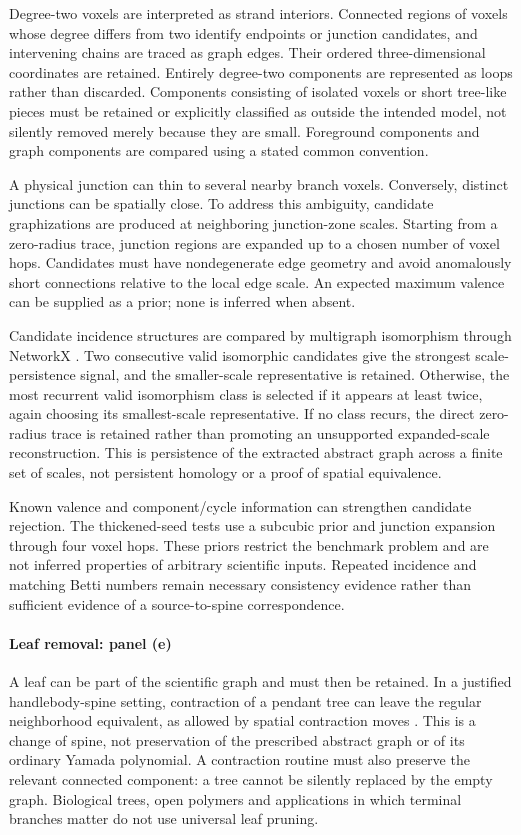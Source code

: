 Degree-two voxels are interpreted as strand interiors. Connected regions of voxels whose degree differs from two identify endpoints or junction candidates, and intervening chains are traced as graph edges. Their ordered three-dimensional coordinates are retained. Entirely degree-two components are represented as loops rather than discarded. Components consisting of isolated voxels or short tree-like pieces must be retained or explicitly classified as outside the intended model, not silently removed merely because they are small. Foreground components and graph components are compared using a stated common convention.

A physical junction can thin to several nearby branch voxels. Conversely, distinct junctions can be spatially close. To address this ambiguity, candidate graphizations are produced at neighboring junction-zone scales. Starting from a zero-radius trace, junction regions are expanded up to a chosen number of voxel hops. Candidates must have nondegenerate edge geometry and avoid anomalously short connections relative to the local edge scale. An expected maximum valence can be supplied as a prior; none is inferred when absent.

Candidate incidence structures are compared by multigraph isomorphism through NetworkX \cite{kg_hagberg2008networkx,kg_cordella2004vf2}. Two consecutive valid isomorphic candidates give the strongest scale-persistence signal, and the smaller-scale representative is retained. Otherwise, the most recurrent valid isomorphism class is selected if it appears at least twice, again choosing its smallest-scale representative. If no class recurs, the direct zero-radius trace is retained rather than promoting an unsupported expanded-scale reconstruction. This is persistence of the extracted abstract graph across a finite set of scales, not persistent homology or a proof of spatial equivalence.

Known valence and component/cycle information can strengthen candidate rejection. The thickened-seed tests use a subcubic prior and junction expansion through four voxel hops. These priors restrict the benchmark problem and are not inferred properties of arbitrary scientific inputs. Repeated incidence and matching Betti numbers remain necessary consistency evidence rather than sufficient evidence of a source-to-spine correspondence.

\paragraph{Leaf removal: panel (e)}
A leaf can be part of the scientific graph and must then be retained. In a justified handlebody-spine setting, contraction of a pendant tree can leave the regular neighborhood equivalent, as allowed by spatial contraction moves \cite{kg_ishii2012handlebody}. This is a change of spine, not preservation of the prescribed abstract graph or of its ordinary Yamada polynomial. A contraction routine must also preserve the relevant connected component: a tree cannot be silently replaced by the empty graph. Biological trees, open polymers and applications in which terminal branches matter do not use universal leaf pruning.

